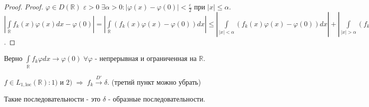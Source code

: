 \begin{enumerate}
\begin{proof}
  \emph{Proof.} \(\varphi   \in  D  (\mathbb{R} )\)
  \(\varepsilon   >  0  \;  \exists  \alpha   >  0  \colon  |\varphi (x)  -  \varphi (0)|  <  \frac{\varepsilon }{2}  \text{ при  }  |x|  \leqslant \alpha \).
  \(\left|\int \limits_{\mathbb{R} } f_{k}  (x) \varphi (x) d x  -  \varphi (0)\right|  =  \left|\int \limits_{\mathbb{R} }  (f_{k}  (x) \varphi   (x)  -  \varphi (0)) d x\right|  \leqslant  \left|\int \limits_{|x|  < \alpha }  (f_{k}  (x) \varphi   (x)  -  \varphi (0)) d x\right|  +  \left|\int \limits_{|x|  > \alpha }  (f_{k}  (x) \varphi   (x)  -  \varphi (0)) d x\right|  \leqslant  \frac{\varepsilon }{2}  \int \limits_{-  \alpha }^{\alpha } f_{k}  (x) d x  +  2  \max\limits_{\mathbb{R} }  |\varphi |  \int \limits_{|x|  > \alpha } f_{k}  (x) d x  \rightarrow   \frac{\varepsilon }{2}  \;  \Rightarrow   \;  \exists  K  \colon  \left|\int \limits_{\mathbb{R} } f_{k} \varphi _{k} d x  -  \varphi   (0)\right|  < \varepsilon   \text{ при  } k  > K  \;  \Rightarrow   \;  (f_k, \varphi )  \rightarrow  \varphi (0)  \;  \Rightarrow   \; f_{k}  \xrightarrow{D'} \delta \).

  \end{proof}

  \begin{warning}

  Верно
  \(\int \limits_{\mathbb{R} } f_{k} \varphi  d x  \rightarrow  \varphi (0)  \;  \forall  \varphi   \text{  -  непрерывная и ограниченная на  } \mathbb{R} \).

  \end{warning}

  \begin{exercise}

  \(f  \in  L_{1,  \mathrm{loc}}  (\mathbb{R} )  \colon  \text{1) и  2)}  \;  \Rightarrow   \; f_{k}  \xrightarrow{D'} \delta \).
  (третий пункт можно убрать)

  \end{exercise}

  \begin{warning}

  Такие последовательности - это \(\delta \) - образные
  последовательности.

  \end{warning}

  \begin{example}


\end{example}
\end{enumerate}
